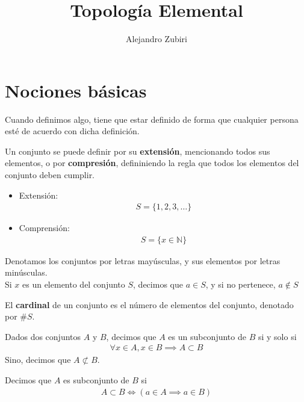\documentclass{article}
\author{Alejandro Zubiri}
\title{Topología Elemental}
\begin{document}
\maketitle
\tableofcontents
\pagebreak
\section{Nociones básicas}
Cuando definimos algo, tiene que estar definido de forma que cualquier persona
esté de acuerdo con dicha definición.
\begin{defin}
	Un conjunto se puede definir por su \textbf{extensión}, mencionando todos
	sus elementos, o por \textbf{compresión}, defininiendo la regla que todos
	los elementos del conjunto deben cumplir.
	\begin{itemize}
		\item Extensión:\\
			\begin{equation}
				\begin{split}
					S = \{ 1,2,3,\dots  \}
				\end{split}
			\end{equation}
		\item Comprensión:\\
			\begin{equation}
				\begin{split}
					S = \{ x \in \mathbb{N} \}
				\end{split}
			\end{equation}
	\end{itemize}
	Denotamos los conjuntos por letras mayúsculas, y sus elementos por letras
	minúsculas.\\
	Si $x$ es un elemento del conjunto $S$, decimos que $a \in S$, y si no
	pertenece, $a \notin S$
\end{defin}
\begin{defin}
	El \textbf{cardinal} de un conjunto es el número de elementos del conjunto,
	denotado por $\#S$. 
\end{defin}
Dados dos conjuntos $A$ y $B$, decimos que $A$ es un subconjunto de $B$ si y solo
si
\begin{equation}
	\begin{split}
		\forall x \in A, x \in B \implies A \subset B
	\end{split}
\end{equation}
Sino, decimos que $A \not\subset B$.
\begin{defin}
	Decimos que $A$ es subconjunto de $B$ si
	\begin{equation}
		\begin{split}
			A \subset B \iff (a \in A \implies a \in B)
		\end{split}
	\end{equation}
\end{defin}
\end{document}
